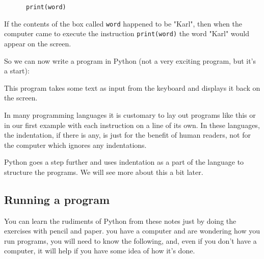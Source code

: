 \begin{Verbatim}
      print(word)
\end{Verbatim}

If the contents of the box called \verb!word! happened to be "Karl", then when the
computer came to execute the instruction \verb!print(word)! the word "Karl" would appear
on the screen.  



So we can now write a program in Python (not a very exciting program,
but it's a start):


This program takes some text as input from the keyboard and displays it
back on the screen.

In many programming languages it is customary to lay out programs like this
or in our first example with each instruction on a line of its own.
In these languages, the indentation, if there is any, is just for the benefit
of human readers, not for the computer which ignores any indentations.

Python goes a step further and uses indentation as a part of the language
to structure the programs. We will see more about this a bit later.


\subsection{Running a program}

You can learn the rudiments of Python from these notes just by doing the
exercises with pencil and paper.
you have a computer and are wondering how
you run
programs, you will need to know the following, and, even if you don't have
a computer, it will help if you have some idea of how it's done.

